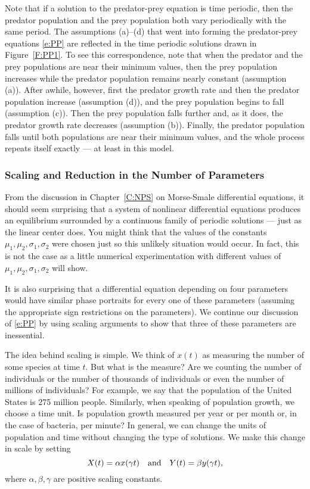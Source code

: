 \documentclass{ximera}
\begin{document}
Note that if a solution to the predator-prey equation is time periodic, then 
the predator population and the prey population both vary periodically with 
the same period.  The assumptions (a)--(d) that went into forming the
predator-prey equations \eqref{e:PP} are reflected in the time periodic 
solutions drawn in Figure~\ref{F:PP1}.  To see this correspondence, note that 
when the predator and the prey populations are near their minimum values, then 
the prey population increases while the predator population remains nearly 
constant (assumption (a)).  After awhile, however, first the predator growth
rate and then the predator population increase (assumption (d)), and the prey 
population begins to fall (assumption (c)).  Then the prey population falls 
further and, as it does, the predator growth rate decreases (assumption (b)). 
Finally, the predator population falls until both populations are near their 
minimum values, and the whole process repeats itself exactly --- at least in
this model.  

\subsubsection*{Scaling and Reduction in the Number of Parameters}

From the discussion in Chapter~\ref{C:NPS} on Morse-Smale differential
equations, it should seem surprising that a system of nonlinear differential 
equations produces an equilibrium surrounded by a continuous family of 
periodic solutions --- just as the linear center does.  You 
might think that the values of the constants $\mu_1,\mu_2,\sigma_1,\sigma_2$ 
were chosen just so this unlikely situation would occur.  In fact, this is 
not the case as a little numerical experimentation with different values of 
$\mu_1,\mu_2,\sigma_1,\sigma_2$ will show.  

It is also surprising that a differential equation depending on four
parameters would have similar phase portraits for every one of
these parameters (assuming the appropriate sign restrictions on
the parameters).  We continue our discussion of \eqref{e:PP} by using scaling
arguments to show that three of these parameters are inessential.  

The idea behind scaling is simple.  We think of $x(t)$ as measuring the 
number of some species at time $t$.  But what is the measure?  Are we 
counting the number of individuals or the number of thousands of
individuals or even the number of millions of individuals?  For example, 
we say that the population of the United States is 275 
million people.  Similarly, when speaking of population growth, 
we choose a time unit.  Is population growth measured per year 
or per month or, in the case of bacteria, per minute?  In general, we can 
change the units of population and time without changing the type of 
solutions.  We make this change in scale by setting  
\[
X(t) = \alpha x(\gamma t)  \quad\mbox{and}\quad  Y(t) = \beta y(\gamma t),
\]
where $\alpha,\beta,\gamma$ are positive scaling constants.  
\end{document}
